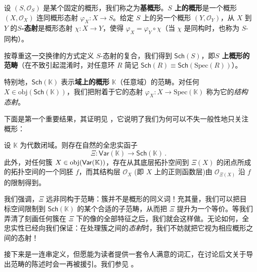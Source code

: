 \begin{Def}
设 $(S,\mathcal{O}_S)$ 是某个固定的概形，我们称之为\textbf{基概形}。\textbf{$S$ 上的概形}是一个概形 $(X,\mathcal{O}_X)$ 连同概形态射 $\varphi_X:X\rightarrow S$。给定 $S$ 上的另一个概形 $(Y,\mathcal{O}_Y)$，从 $X$ 到 $Y$ 的\textbf{$S$-态射}是概形态射 $\chi:X\rightarrow Y$，使得 $\varphi_X=\varphi_Y\circ\chi$（当 $\chi$ 是同构时，也称为 $S$-同构）。

按尊重这一交换律的方式定义 $S$-态射的复合，我们得到 $\mathsf{Sch}(S)$，即\textbf{$S$ 上概形的范畴}（在不致引起混淆时，对任意环 $R$ 简记 $\mathsf{Sch}(R)\equiv\mathsf{Sch}(\text{Spec}(R))$）。

特别地，$\mathsf{Sch}(\mathbb{K})$ 表示\textbf{域上的概形} $\mathbb{K}$（任意域）的范畴。对任何 $X\in\text{obj}(\mathsf{Sch}(\mathbb{K}))$，我们把附着于它的态射 $\varphi_X:X\rightarrow\text{Spec}(\mathbb{K})$ 称为它的\textit{结构态射}。 
\end{Def}

下面是第一个重要结果，其证明见 \cite[命题 II.2.6]{[Har77]}，它说明了我们为何可以不失一般性地只关注概形：

\begin{Pro}\label{XiPro}
设 $\mathbb{K}$ 为代数闭域。则存在自然的全忠实函子
\begin{equation}\label{Xi}
	\Xi:\mathsf{Var}(\mathbb{K})\rightarrow\mathsf{Sch}(\mathbb{K})\,.
\end{equation}
此外，对任何簇 $X\in\textup{obj}(\mathsf{Var}(\mathbb{K}))$，存在从其底层拓扑空间到 $\Xi(X)$ 的闭点所成的拓扑空间的一个同胚 $f$，而其结构层 $\mathcal{O}_X$ \textup(即 $X$ 上的正则函数层\textup)由 $\mathcal{O}_{\Xi(X)}$ 沿 $f$ 的限制得到。
\end{Pro}

我们强调，$\Xi$ 远非同构于范畴：簇并不是概形的同义词！充其量，我们可以把目标空间限制到 $\mathsf{Sch}(\mathbb{K})$ 的某个合适的子范畴，从而把 $\Xi$ 提升为一个等价。等我们弄清了刻画任何簇在 $\Xi$ 下的像的全部特征之后，我们就会这样做。无论如何，全忠实性已经向我们保证：在处理簇之间的\textit{态射}时，我们不妨就把它视为相应概形之间的态射！

接下来是一连串定义，但愿能为读者提供一套令人满意的词汇，在讨论后文关于导出范畴的陈述时会一再被援引。我们参见 \cite[第 II.3–II.4 节]{[Har77]}。

